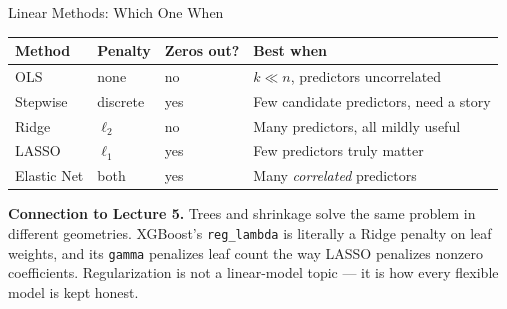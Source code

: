 \documentclass[aspectratio=169, 11pt]{beamer}
\begin{document}
\begin{frame}{Linear Methods: Which One When}
  \begin{center}
    {\small
    \begin{tabular}{llll}
      \toprule
      \textbf{Method} & \textbf{Penalty} & \textbf{Zeros out?} & \textbf{Best when} \\
      \midrule
      OLS & none & no & $k \ll n$, predictors uncorrelated \\
      Stepwise & discrete & yes & Few candidate predictors, need a story \\
      Ridge & $\ell_2$ & no & Many predictors, all mildly useful \\
      LASSO & $\ell_1$ & yes & Few predictors truly matter \\
      Elastic Net & both & yes & Many \emph{correlated} predictors \\
      \bottomrule
    \end{tabular}
    }
  \end{center}
  \vspace{0.15cm}
  \textbf{Connection to Lecture 5.} Trees and shrinkage solve the same problem in different
  geometries. XGBoost's \texttt{reg\_lambda} is literally a Ridge penalty on leaf weights,
  and its \texttt{gamma} penalizes leaf count the way LASSO penalizes nonzero coefficients.
  Regularization is not a linear-model topic --- it is how every flexible model is kept
  honest.
\end{frame}
\end{document}
